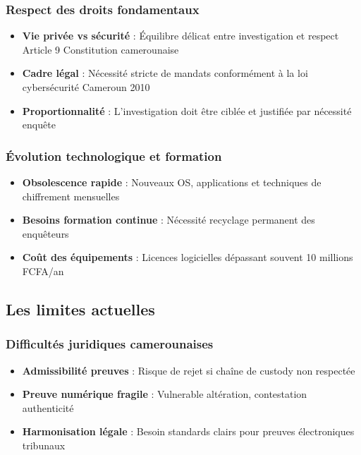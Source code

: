 \documentclass[12pt,a4paper]{article}
\begin{document}
\subsubsection{Respect des droits fondamentaux}
\begin{itemize}[leftmargin=*]
    \item \textbf{Vie privée vs sécurité} : Équilibre délicat entre investigation et respect Article 9 Constitution camerounaise
    \item \textbf{Cadre légal} : Nécessité stricte de mandats conformément à la loi cybersécurité Cameroun 2010
    \item \textbf{Proportionnalité} : L'investigation doit être ciblée et justifiée par nécessité enquête
\end{itemize}

\subsubsection{Évolution technologique et formation}
\begin{itemize}[leftmargin=*]
    \item \textbf{Obsolescence rapide} : Nouveaux OS, applications et techniques de chiffrement mensuelles
    \item \textbf{Besoins formation continue} : Nécessité recyclage permanent des enquêteurs
    \item \textbf{Coût des équipements} : Licences logicielles dépassant souvent 10 millions FCFA/an
\end{itemize}

\subsection{Les limites actuelles}

\subsubsection{Difficultés juridiques camerounaises}
\begin{itemize}[leftmargin=*]
    \item \textbf{Admissibilité preuves} : Risque de rejet si chaîne de custody non respectée
    \item \textbf{Preuve numérique fragile} : Vulnerable altération, contestation authenticité
    \item \textbf{Harmonisation légale} : Besoin standards clairs pour preuves électroniques tribunaux
\end{itemize}
\end{document}
